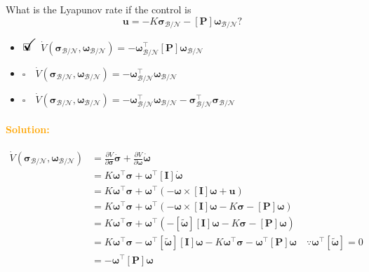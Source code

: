 \documentclass[12pt, a4paper]{article}
\newcommand{\ans}{\item[]$\rlap{\LARGE{\checkmark}}\square\quad$}
\newcommand{\noans}{\item[]$\square\quad$}
\begin{document}
What is the Lyapunov rate if the control is 
$$\bm{u} = -K \bm{\sigma}_{\mathcal{B}/\mathcal{N}} - [\bm{P}]\bm{\omega}_{\mathcal{B}/\mathcal{N}}?$$

\begin{itemize}
\ans $\dot{V}(\bm{\sigma}_{\mathcal{B}/\mathcal{N}},\bm{\omega}_{\mathcal{B}/\mathcal{N}}) = -\bm{\omega}^{\intercal}_{\mathcal{B}/\mathcal{N}}[\bm{P}]\bm{\omega}_{\mathcal{B}/\mathcal{N}}$
\noans $\dot{V}(\bm{\sigma}_{\mathcal{B}/\mathcal{N}},\bm{\omega}_{\mathcal{B}/\mathcal{N}}) = -\bm{\omega}^{\intercal}_{\mathcal{B}/\mathcal{N}}\bm{\omega}_{\mathcal{B}/\mathcal{N}}$
\noans $\dot{V}(\bm{\sigma}_{\mathcal{B}/\mathcal{N}},\bm{\omega}_{\mathcal{B}/\mathcal{N}}) = -\bm{\omega}^{\intercal}_{\mathcal{B}/\mathcal{N}}\bm{\omega}_{\mathcal{B}/\mathcal{N}} - \bm{\sigma}^{\intercal}_{\mathcal{B}/\mathcal{N}}\bm{\sigma}_{\mathcal{B}/\mathcal{N}}$
\end{itemize}

\paragraph{\textcolor{orange}{Solution:}}
\begin{equation*}
    \begin{split}
        \dot{V}(\bm{\sigma}_{\mathcal{B}/\mathcal{N}},\bm{\omega}_{\mathcal{B}/\mathcal{N}}) &= \frac{\partial V}{\partial\bm{\sigma}}\dot{\bm{\sigma}} + \frac{\partial V}{\partial\bm{\omega}}\dot{\bm{\omega}}\\
        &= K\bm{\omega}^{\intercal}\bm{\sigma} + \bm{\omega}^{\intercal}[\bm{I}]\dot{\bm{\omega}}\\
        &= K\bm{\omega}^{\intercal}\bm{\sigma} + \bm{\omega}^{\intercal}(-\bm{\omega}\times[\bm{I}]\bm{\omega} + \bm{u})\\
        &= K\bm{\omega}^{\intercal}\bm{\sigma} + \bm{\omega}^{\intercal}(-\bm{\omega}\times[\bm{I}]\bm{\omega} - K\bm{\sigma}-[\bm{P}]\bm{\omega})\\
        &= K\bm{\omega}^{\intercal}\bm{\sigma} + \bm{\omega}^{\intercal}(-[\tilde{\bm{\omega}}][\bm{I}]\bm{\omega} - K\bm{\sigma}-[\bm{P}]\bm{\omega})\\
        &= K\bm{\omega}^{\intercal}\bm{\sigma} - \bm{\omega}^{\intercal}[\tilde{\bm{\omega}}][\bm{I}]\bm{\omega} - K\bm{\omega}^{\intercal}\bm{\sigma}-\bm{\omega}^{\intercal}[\bm{P}]\bm{\omega}\quad\because \bm{\omega}^{\intercal}[\tilde{\bm{\omega}}]=0\\
        &=-\bm{\omega}^{\intercal}[\bm{P}]\bm{\omega}\\
    \end{split}
\end{equation*}
\end{document}
